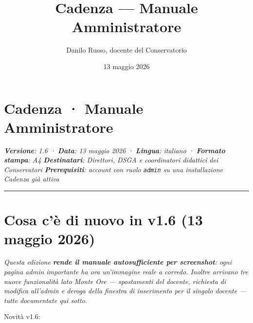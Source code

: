 \documentclass[11pt,a4paper]{article}
\title{Cadenza --- Manuale Amministratore}
\author{Danilo Russo, docente del Conservatorio}
\date{13 maggio 2026}
\renewenvironment{quote}
  {\begin{list}{}{%
      \setlength{\leftmargin}{8pt}%
      \setlength{\rightmargin}{8pt}%
      \setlength{\topsep}{6pt}%
      \setlength{\parsep}{0pt}}%
      \item\relax\color{black!75}\itshape}
  {\end{list}}
\begin{document}
\maketitle
\thispagestyle{fancy}

\tableofcontents
\clearpage

\section*{Cadenza · Manuale Amministratore}


\begin{quote}
\textbf{Versione}: 1.6 · \textbf{Data}: 13 maggio 2026 · \textbf{Lingua}: italiano · \textbf{Formato stampa}: A4 \textbf{Destinatari}: Direttori, DSGA e coordinatori didattici dei Conservatori \textbf{Prerequisiti}: account con ruolo \texttt{admin} su una installazione Cadenza già attiva
\end{quote}

\medskip\hrule\medskip

\section{Cosa c'è di nuovo in v1.6 (13 maggio 2026)}


\begin{quote}
Questa edizione \textbf{rende il manuale autosufficiente per screenshot}: ogni pagina admin importante ha ora un'immagine reale a corredo. Inoltre arrivano tre nuove funzionalità lato Monte Ore --- \textit{spostamenti del docente}, \textit{richiesta di modifica all'admin} e \textit{deroga della finestra di inserimento per il singolo docente} --- tutte documentate qui sotto.
\end{quote}

Novità v1.6:
\end{document}
